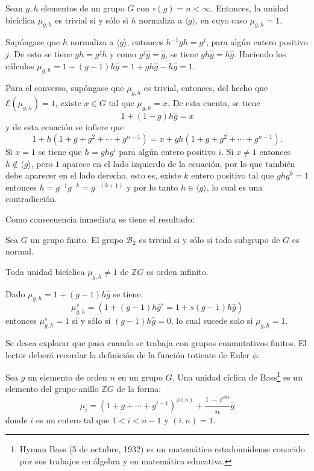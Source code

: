 \begin{proposicion}\label{prop:unidadesb}
Sean $g,h$ elementos de un grupo $G$ con $\circ(g) = n < \infty$. Entonces, la unidad bicíclica $\mu_{g,h}$ es trivial si y sólo si $h$ normaliza a $\langle g \rangle$, en cuyo caso $\mu_{g,h} = 1$.
\end{proposicion}
\begin{proof*}
Supóngase que $h$ normaliza a $\langle g \rangle$, entonces $h^{-1}gh = g^j$, para algún entero positivo $j$. De esto se tiene $gh = g^jh$ y como $g^j\hat{g} = \hat{g}$, se tiene $gh\hat{g} = h\hat{g}$. Haciendo los cálculos $\mu_{g,h} = 1+(g-1)h\hat{g}= 1+gh\hat{g}-h\hat{g} =1$.

Para el converso, supóngase que $\mu_{g,h}$ es trivial, entonces, del hecho que $\mathcal{E}(\mu_{g,h})=1$, existe $x \in G$ tal que $\mu_{g,h}=x$. De esta cuenta, se tiene
\[ 1+(1-g)h\hat{g} = x \] y de esta ecuación se infiere que \[ 1+ h(1+g+g^2+\cdots + g^{n-1}) = x +gh(1+g+g^2+\cdots+g^{n-1}).  \] 
\indent Si $x=1$ se tiene que $h=ghg^i$ para algún entero positivo $i$. Si $x \neq 1$ entonces $h \notin \langle g \rangle$, pero $1$ aparece en el lado izquierdo de la ecuación, por lo que también debe aparecer en el lado derecho, esto es, existe $k$ entero positivo tal que $ghg^k = 1$ entonces $h = g^{-1}g^{-k}= g^{-(k+1)}$ y por lo tanto $h \in \langle g \rangle$, lo cual es una contradicción. 
\end{proof*}
Como consecuencia inmediata se tiene el resultado:
\begin{proposicion}
Sea $G$ un grupo finito. El grupo $\mathcal{B}_2$ es trivial si y sólo si todo subgrupo de $G$ es normal.
\end{proposicion}
\begin{proposicion}
Toda unidad bicíclica $\mu_{g,h} \neq 1$ de $\mathds{Z}G$ es orden infinito. 
\end{proposicion}
\begin{proof*}
Dado $\mu_{g,h} = 1 +(g-1)h\hat{g}$ se tiene:
\[  \mu_{g,h}^s = (1+(g-1)h\hat{g}^s = 1+s(g-1)h\hat{g})  \] entonces $\mu_{g,h}^s = 1$ si y sólo si $(g-1)h\hat{g} = 0$, lo cual sucede solo si $\mu_{g,h} = 1$.
\end{proof*}
Se desea explorar que pasa cuando se trabaja con grupos conmutativos finitos. El lector deberá recordar la definición de la función totiente de Euler $\phi$. 
\begin{definicion}
Sea $g$ un elemento de orden $n$ en un grupo $G$. Una unidad cíclica \nopagebreak[0] de Bass\footnote{Hyman Bass (5 de octubre, 1932) es un matemático estadounidense conocido por sus trabajos en álgebra y en matemática educativa.  } es un elemento del grupo-anillo $\mathds{Z}G$ de la forma:
\[ \mu_{i} = (1+g+\cdots+g^{i-1})^{\phi(n)} + \frac{1-i^{\phi{n}}}{n}\hat{g}  \] donde $i$ es un entero tal que $1<i<n-1$ y $(i,n) = 1$.
\end{definicion}
